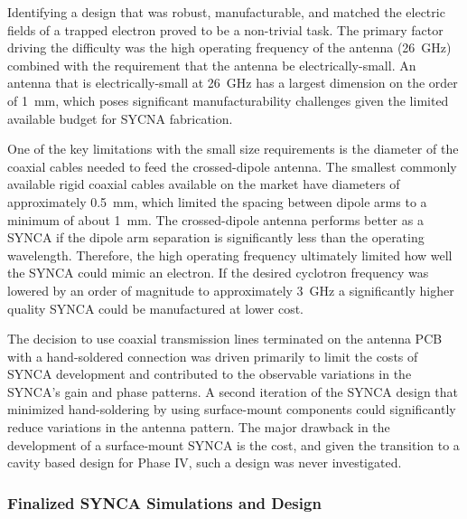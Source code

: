 Identifying a design that was robust, manufacturable, and matched the electric fields of a trapped electron proved to be a non-trivial task. The primary factor driving the difficulty was the high operating frequency of the antenna (26~GHz) combined with the requirement that the antenna be electrically-small. An antenna that is electrically-small at 26~GHz has a largest dimension on the order of 1~mm, which poses significant manufacturability challenges given the limited available budget for SYCNA fabrication.

One of the key limitations with the small size requirements is the diameter of the coaxial cables needed to feed the crossed-dipole antenna. The smallest commonly available rigid coaxial cables available on the market have diameters of approximately 0.5~mm, which limited the spacing between dipole arms to a minimum of about 1~mm. The crossed-dipole antenna performs better as a SYNCA if the dipole arm separation is significantly less than the operating wavelength. Therefore, the high operating frequency ultimately limited how well the SYNCA could mimic an electron. If the desired cyclotron frequency was lowered by an order of magnitude to approximately 3~GHz a significantly higher quality SYNCA could be manufactured at lower cost.

The decision to use coaxial transmission lines terminated on the antenna PCB with a hand-soldered connection was driven primarily to limit the costs of SYNCA development and contributed to the observable variations in the SYNCA's gain and phase patterns. A second iteration of the SYNCA design that minimized hand-soldering by using surface-mount components could significantly reduce variations in the antenna pattern. The major drawback in the development of a surface-mount SYNCA is the cost, and given the transition to a cavity based design for Phase IV, such a design was never investigated.

\subsubsection*{Finalized SYNCA Simulations and Design}

